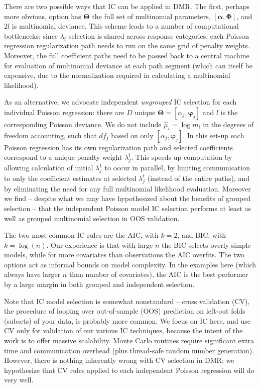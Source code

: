 \documentclass[12pt]{article}
\newcommand{\bs}[1]{\boldsymbol{#1}}
\begin{document}
There are two possible ways that IC can be applied in DMR.  The first, perhaps more obvious, option has $\bs{\Theta}$ the full set of multinomial parameters, $[\bs{\alpha},\bs{\Phi}]$, and $2l$ is multinomial deviance.  This scheme leads to a number of computational bottlenecks: since $\lambda_t$ selection is shared across response categories, each 
 Poisson regression regularization path needs to run on the same grid of penalty weights.  Moreover, the full coefficient paths need to be passed back to a central machine for evaluation of multinomial deviance at each path segment (which can itself be expensive, due to the normalization required in calculating a multinomial likelihood).  

As an alternative, we advocate independent {\it ungrouped} IC selection for each individual Poisson regression: there are $D$ unique $\bs{\Theta} = [\alpha_j,\bs{\varphi}_j]$ and $l$ is 
the corresponding Poisson deviance.  We do not include $\hat \mu_i = \log m_i$ in the degrees of freedom accounting, such that $df_j$ based on only $[\alpha_j,\bs{\varphi}_j]$.
In this set-up each Poisson regression has its own
regularization path and selected coefficients correspond to a unique penalty weight $\lambda^t_j$.  This speeds up computation by allowing calculation of initial $\lambda^1_j$ to occur in parallel, by limiting communication to only the coefficient estimates at selected $\lambda^t_j$ (instead of the entire paths), and by eliminating the need for any full multinomial likelihood evaluation.  Moreover we find -- despite what we may have hypothesized about the benefits of grouped selection -- that the independent Poisson model IC selection performs at least as well as grouped multinomial selection in OOS validation.  

The two most common IC rules are the AIC, with $k=2$, and BIC, with
$k=\log(n)$. Our experience is that with large $n$ the BIC selects overly
simple models, while for more covariates than observations the AIC overfits.
The two options act as informal bounds on model complexity.
In the examples here (which always have larger $n$ than number of
covariates), the AIC is the best performer by a large margin in both grouped and independent selection.  

Note that IC model selection is somewhat nonstandard  -- cross validation
(CV), the procedure of looping over out-of-sample (OOS) prediction on 
left-out folds (subsets) of your data, is probably more common.  We focus on IC here, and use CV only for validation of our various IC techniques, because the intent of the work is to offer massive scalability. Monte Carlo routines require significant extra time and communication overhead (plus thread-safe random number generation).  However, there is  nothing inherently wrong with CV selection in DMR; we hypothesize that CV rules applied to each independent Poisson regression will do very well.
\end{document}
